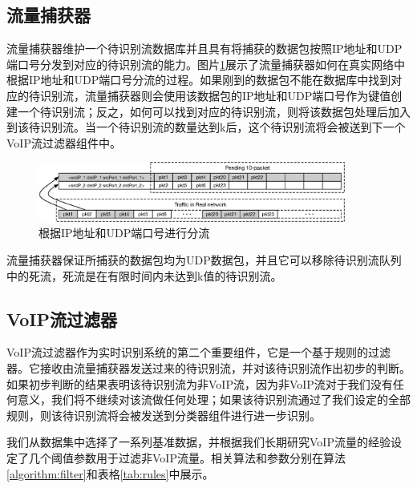 \subsection{流量捕获器}
流量捕获器维护一个待识别流数据库并且具有将捕获的数据包按照IP地址和UDP端口号分发到对应的待识别流的能力。图片\ref{fig:flow}展示了流量捕获器如何在真实网络中根据IP地址和UDP端口号分流的过程。如果刚到的数据包不能在数据库中找到对应的待识别流，流量捕获器则会使用该数据包的IP地址和UDP端口号作为键值创建一个待识别流；反之，如何可以找到对应的待识别流，则将该数据包处理后加入到该待识别流。当一个待识别流的数量达到k后，这个待识别流将会被送到下一个VoIP流过滤器组件中。


\begin{figure}[htp]
\begin{center}
\includegraphics[width=0.9\textwidth]{figures/flow.eps}
\caption{根据IP地址和UDP端口号进行分流}\label{fig:flow}
\end{center}
\end{figure}

流量捕获器保证所捕获的数据包均为UDP数据包，并且它可以移除待识别流队列中的死流，死流是在有限时间内未达到k值的待识别流。

\subsection{VoIP流过滤器}
VoIP流过滤器作为实时识别系统的第二个重要组件，它是一个基于规则的过滤器。它接收由流量捕获器发送过来的待识别流，并对该待识别流作出初步的判断。如果初步判断的结果表明该待识别流为非VoIP流，因为非VoIP流对于我们没有任何意义，我们将不继续对该流做任何处理；如果该待识别流通过了我们设定的全部规则，则该待识别流将会被发送到分类器组件进行进一步识别。

我们从数据集中选择了一系列基准数据，并根据我们长期研究VoIP流量的经验设定了几个阈值参数用于过滤非VoIP流量。相关算法和参数分别在算法\ref{algorithm:filter}和表格\ref{tab:rules}中展示。

